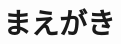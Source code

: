 \documentclass[technicalreport]{ieicej}
\begin{document}
\begin{abstract}
\end{abstract}
\begin{keyword}
\end{keyword}
\begin{eabstract}
\end{eabstract}
\begin{ekeyword}
\end{ekeyword}
\maketitle

\section{まえがき}


\ack %

%
%
\begin{thebibliography}{99}%
\bibitem{}
\end{thebibliography}

\appendix
\section{}

\begin{biography}
\profile{}{}{}
\end{biography}
\end{document}
